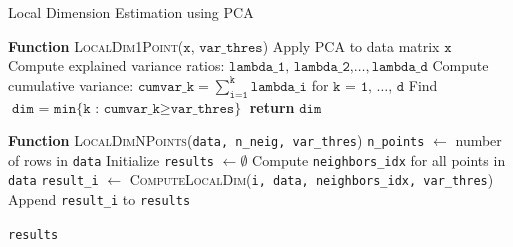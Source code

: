 \documentclass[11pt]{article}
\begin{document}
\begin{algorithm}
	\caption{Local Dimension Estimation using PCA}
	\label{alg:local-dim}
	\begin{algorithmic}[1]
		
		\State \textbf{Function} \textsc{LocalDim1Point}($\texttt{x}$, $\texttt{var\_thres}$)
		\State \hspace{0.5cm} Apply PCA to data matrix $\texttt{x}$
		\State \hspace{0.5cm} Compute explained variance ratios: $\texttt{lambda\_1, lambda\_2,} \ldots, \texttt{lambda\_d}$
		\State \hspace{0.5cm} Compute cumulative variance: $\texttt{cumvar\_k} = \sum_{\texttt{i=1}}^\texttt{k} \texttt{lambda\_i}$ for $\texttt{k = 1, }\ldots\texttt{, d}$
		\State \hspace{0.5cm} Find $\texttt{dim = min\{k : cumvar\_k} \geq \texttt{var\_thres\}}$
		\State \hspace{0.5cm} \textbf{return} $\texttt{dim}$
		\State
		


		\State \textbf{Function} \textsc{LocalDimNPoints}(\texttt{data, n\_neig, var\_thres})
		\State \hspace{0.5cm} \texttt{n\_points} $\leftarrow$ number of rows in \texttt{data}
		\State \hspace{0.5cm} Initialize \texttt{results} $\leftarrow \emptyset$
		\State \hspace{0.5cm} Compute \texttt{neighbors\_idx} for all points in \texttt{data}
		 
		\State \texttt{result\_i} $\leftarrow$ \textsc{ComputeLocalDim}(\texttt{i, data, neighbors\_idx, var\_thres})
		\State Append \texttt{result\_i} to \texttt{results}
		\EndFor

		
		\Return \texttt{results}
	\end{algorithmic}
\end{algorithm}
\end{document}
